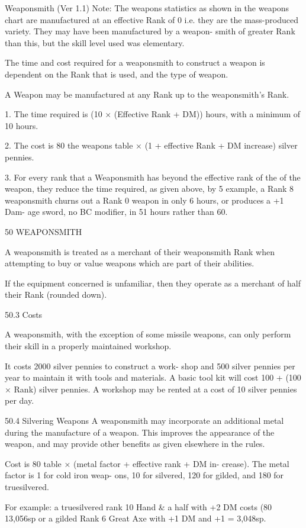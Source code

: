 \begin{Chapter}{Weaponsmith (Ver 1.1)}
Note:  The  weapons  statistics  as  shown  in  the 
weapons  chart  are  manufactured  at  an  effective 
Rank  of  0 i.e.  they  are  the  mass-produced  variety. 
They  may  have  been  manufactured  by  a  weapon-
smith  of  greater  Rank  than  this, but  the  skill  level 
used was elementary. 

The  time  and  cost  required  for  a  weaponsmith 
to construct a weapon is dependent on the Rank 
that is used, and the type of weapon. 

A Weapon may be manufactured at any Rank up to 
the weaponsmith’s Rank. 

1.  The  time  required  is  (10  ×  (Effective  Rank  + 
DM)) hours, with a minimum of 10 hours. 

2.  The  cost  is  80%
the  weapons  table  ×  (1  +  effective  Rank  +  DM 
increase) silver pennies. 

3.  For  every  rank  that  a Weaponsmith  has  beyond 
the effective rank of the of the weapon, they reduce 
the  time  required,  as  given  above,  by  5%
example, a Rank 8 weaponsmith churns out a Rank 
0 weapon in only 6 hours, or produces a +1 Dam-
age sword, no BC modifier, in 51 hours rather than 
60. 

50 WEAPONSMITH 

A weaponsmith is treated as a merchant of their 
weaponsmith  Rank  when  attempting  to  buy  or 
value weapons which are part of their abilities. 

If the equipment concerned is unfamiliar, then they 
operate  as  a  merchant  of  half  their  Rank  (rounded 
down). 

50.3 Costs 

A  weaponsmith,  with  the  exception  of  some 
missile weapons, can only perform  their skill in 
a properly maintained workshop. 

It  costs  2000  silver  pennies  to  construct  a  work-
shop and 500 silver pennies per year to maintain it 
with tools and materials. A basic tool kit will cost 
100  +  (100  ×  Rank)  silver  pennies.  A  workshop 
may  be  rented  at  a  cost  of  10  silver  pennies  per 
day. 

50.4 Silvering Weapons 
A  weaponsmith  may  incorporate  an  additional 
metal  during  the  manufacture  of  a  weapon.  This 
improves  the  appearance  of  the  weapon,  and  may 
provide  other  benefits  as  given  elsewhere  in  the 
rules. 

Cost is 80%
table  ×  (metal  factor  +  effective  rank  +  DM  in-
crease).  The  metal  factor  is  1  for  cold  iron  weap-
ons,  10  for  silvered,  120  for  gilded,  and  180  for 
truesilvered. 

For example: a truesilvered rank 10 Hand \& a half 
with +2 DM costs (80%
13,056sp  or  a  gilded  Rank  6  Great  Axe  with  +1 
DM and +1%
= 3,048sp. 

\end{Chapter}
